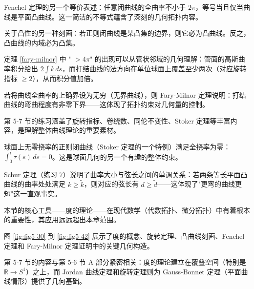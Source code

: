 \begin{Remark}
Fenchel 定理的另一个等价表述：任意闭曲线的全曲率不小于 $2\pi$，等号当且仅当曲线是平面凸曲线。这一简洁的不等式蕴含了深刻的几何拓扑内容。
\end{Remark}

\begin{Remark}
关于凸性的另一种刻画：若正则闭曲线是某凸集的边界，则它必为凸曲线。反之，凸曲线的内域必为凸集。
\end{Remark}

\begin{Remark}
定理 \ref{fary-milnor} 中 " $>4\pi$" 的出现可以从管状邻域的几何理解：管面的高斯曲率积分给出 $2\int k\,ds$，而打结曲线的法方向在单位球面上覆盖至少两次（对应旋转指标 $\geq 2$），从而积分值加倍。
\end{Remark}

\begin{Remark}
若将曲线全曲率的上确界设为无穷（无界曲线），则 Fary-Milnor 定理说明：打结曲线的弯曲程度有非零下界——这体现了拓扑约束对几何量的控制。
\end{Remark}

\begin{Remark}
第 5-7 节的练习涵盖了旋转指标、卷绕数、同伦不变性、Stoker 定理等丰富内容，是理解整体曲线理论的重要素材。
\end{Remark}

\begin{Remark}
球面上无零挠率的正则闭曲线（Stoker 定理的一个特例）满足全挠率为零：$\int_0^l \tau(s)\,ds = 0$。这是球面几何的另一个有趣的整体约束。
\end{Remark}

\begin{Remark}
Schur 定理（练习 7）说明了曲率大小与弦长之间的单调关系：若两条等长平面凸曲线的曲率处处满足 $k \geq \tilde{k}$，则对应的弦长有 $d \geq \tilde{d}$——这体现了"更弯的曲线更短"这一直观事实。
\end{Remark}

\begin{Remark}
本节的核心工具——度的理论——在现代数学（代数拓扑、微分拓扑）中有着根本的重要性，其应用远远超出本章范围。
\end{Remark}

\begin{Remark}
图 \cref{fig:fig5-30} 到 \cref{fig:fig5-42} 展示了度的概念、旋转定理、凸曲线刻画、Fenchel 定理和 Fary-Milnor 定理证明中的关键几何构造。
\end{Remark}

\begin{Remark}
第 5-7 节的内容与第 5-6 节 A 部分紧密相关：度的理论建立在覆叠空间（特别是 $\mathbb{R} \to S^1$）之上，而 Jordan 曲线定理和旋转定理则为 Gauss-Bonnet 定理（平面曲线情形）提供了几何基础。
\end{Remark}

